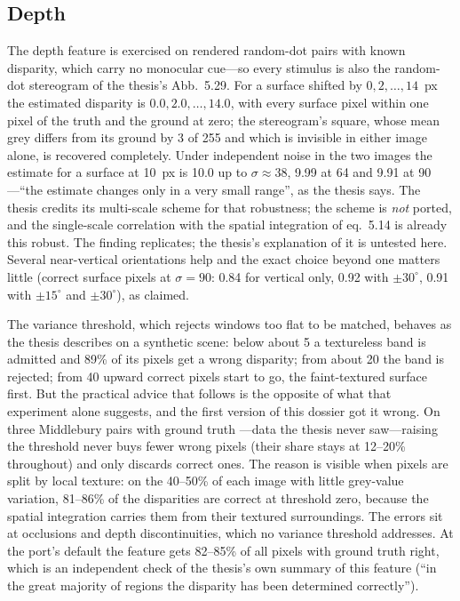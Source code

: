 \documentclass[11pt,a4paper]{article}
\begin{document}
\subsection{Depth}
The depth feature is exercised on rendered random-dot pairs with known
disparity, which carry no monocular cue---so every stimulus is also the
random-dot stereogram of the thesis's Abb.~5.29. For a surface shifted by
$0, 2, \ldots, 14$~px the estimated disparity is $0.0, 2.0, \ldots, 14.0$, with
every surface pixel within one pixel of the truth and the ground at zero; the
stereogram's square, whose mean grey differs from its ground by 3 of 255 and
which is invisible in either image alone, is recovered completely. Under
independent noise in the two images the estimate for a surface at 10~px is 10.0
up to $\sigma \approx 38$, 9.99 at 64 and 9.91 at 90---``the estimate changes
only in a very small range'', as the thesis says. The thesis credits its
multi-scale scheme for that robustness; the scheme is \emph{not} ported, and the
single-scale correlation with the spatial integration of eq.~5.14 is already
this robust. The finding replicates; the thesis's explanation of it is untested
here. Several near-vertical orientations help and the exact choice beyond one
matters little (correct surface pixels at $\sigma = 90$: 0.84 for vertical only,
0.92 with $\pm30^\circ$, 0.91 with $\pm15^\circ$ and $\pm30^\circ$), as claimed.

The variance threshold, which rejects windows too flat to be matched, behaves as
the thesis describes on a synthetic scene: below about 5 a textureless band is
admitted and 89\% of its pixels get a wrong disparity; from about 20 the band is
rejected; from 40 upward correct pixels start to go, the faint-textured surface
first. But the practical advice that follows is the opposite of what that
experiment alone suggests, and the first version of this dossier got it wrong.
On three Middlebury pairs with ground truth \citep{scharstein2002}---data the
thesis never saw---raising the threshold never buys fewer wrong pixels (their
share stays at 12--20\% throughout) and only discards correct ones. The reason
is visible when pixels are split by local texture: on the 40--50\% of each image
with little grey-value variation, 81--86\% of the disparities are correct at
threshold zero, because the spatial integration carries them from their textured
surroundings. The errors sit at occlusions and depth discontinuities, which no
variance threshold addresses. At the port's default the feature gets 82--85\% of
all pixels with ground truth right, which is an independent check of the
thesis's own summary of this feature (``in the great majority of regions the
disparity has been determined correctly'').
\end{document}

